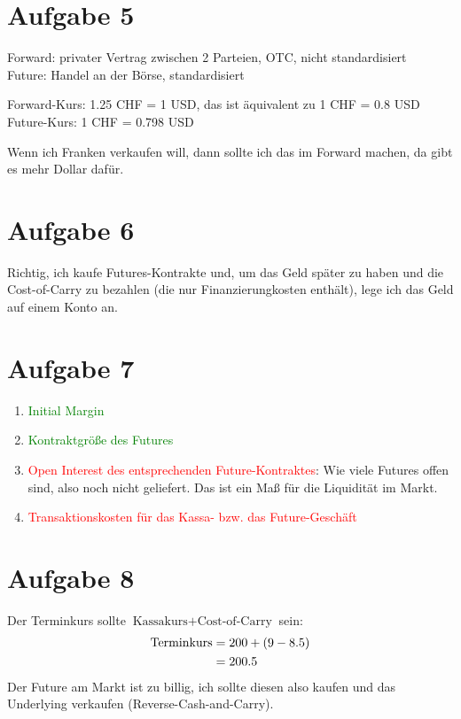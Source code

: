 \documentclass{article}
\begin{document}
	\section*{Aufgabe 5}
	Forward: privater Vertrag zwischen 2 Parteien, OTC, nicht standardisiert \\
	Future: Handel an der Börse, standardisiert
	
	Forward-Kurs: 1.25 CHF = 1 USD, das ist äquivalent zu 1 CHF = 0.8 USD \\
	Future-Kurs: 1 CHF = 0.798 USD
	
	Wenn ich Franken verkaufen will, dann sollte ich das im Forward machen, da gibt es mehr Dollar dafür.
	
	\section*{Aufgabe 6}
	Richtig, ich kaufe Futures-Kontrakte und, um das Geld später zu haben und die Cost-of-Carry zu bezahlen (die nur Finanzierungkosten enthält), lege ich das Geld auf einem Konto an.
	
	\section*{Aufgabe 7}
	\begin{enumerate}[label=(\alph*)]
		\item \textcolor{green}{Initial Margin}
		\item \textcolor{green}{Kontraktgröße des Futures}
		\item \textcolor{red}{Open Interest des entsprechenden Future-Kontraktes}: Wie viele Futures offen sind, also noch nicht geliefert. Das ist ein Maß für die Liquidität im Markt.
		\item \textcolor{red}{Transaktionskosten für das Kassa- bzw. das Future-Geschäft}
	\end{enumerate}
	
	\section*{Aufgabe 8}
	Der Terminkurs sollte $\text{Kassakurs} + \text{Cost-of-Carry}$ sein:
	\begin{align}
		\text{Terminkurs} &= 200 + (9 - 8.5) \notag \\
		&= 200.5 \notag
	\end{align}
	Der Future am Markt ist zu billig, ich sollte diesen also kaufen und das Underlying verkaufen (Reverse-Cash-and-Carry).
	
\end{document}
